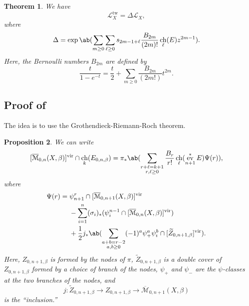 \documentclass[leqno, openany]{memoir}
\newtheorem{thm}{Theorem}[section]
\newtheorem{prop}[thm]{Proposition}
\theoremstyle{definition}
\theoremstyle{remark}
\theoremstyle{plain}
\theoremstyle{definition}
\theoremstyle{remark}
\newcommand{\mc}[1]{\mathcal{#1}}
\newcommand{\mr}[1]{\mathrm{#1}}
\newcommand{\wt}[1]{\widetilde{#1}}
\newcommand{\vir}{\mr{vir}}
\newcommand{\Mbar}{\overline{\mathcal{M}}}
\DeclareMathOperator{\ch}{ch}
\DeclareMathOperator{\ev}{ev}
\begin{document}
\begin{thm}\label{thm:qrr}
    We have
    \[ \mc{L}_X^{\mr{tw}} = \Delta \mc{L}_X, \]
    where
    \[ \Delta = \exp\ab(\sum_{m \geq 0} \sum_{\ell \geq 0} s_{2m-1+\ell} \frac{B_{2m}}{(2m)!} \ch_{\ell}(E) z^{2m-1}). \]
    Here, the Bernoulli numbers $B_{2m}$ are defined by
    \[ \frac{t}{1-e^{-t}} = \frac{t}{2} + \sum_{m \geq 0} \frac{B_{2m}}{(2m!)} t^{2m}. \]
\end{thm}

\subsection{Proof of~}

The idea is to use the Grothendieck-Riemann-Roch theorem.

\begin{prop}
    We can write
    \[ [\Mbar_{0,n}(X,\beta)]^{\vir} \cap \ch_k(E_{0,n,\beta}) = \pi_* \ab(\sum_{\substack{r+\ell=k+1 \\ r,\ell \geq 0}} \frac{B_r}{r!} \ch_{\ell}(\ev^*_{n+1} E) \Psi(r)), \]
    where
    \begin{align*}
        \Psi(r) ={}& \psi_{n+1}^r \cap [\Mbar_{0,n+1}(X,\beta)]^{\vir} \\ 
        &- \sum_{i=1}^n (\sigma_i)_* (\psi_i^{n-1} \cap [\Mbar_{0,n}(X,\beta)]^{\vir}) \\ 
        &+ \frac{1}{2} j_* \ab(\sum_{\substack{a+b=r-2 \\ a,b \geq 0}} (-1)^a \psi_+^a \psi_i^b \cap [\wt{Z}_{0,n+1,\beta}]^{\vir}). 
    \end{align*}
    Here, $Z_{0,n+1,\beta}$ is formed by the nodes of $\pi$, $\wt{Z}_{0,n+1,\beta}$ is a double cover of $Z_{0,n+1,\beta}$ formed by a choice of branch of the nodes,  $\psi_+$ and $\psi_-$ are the $\psi$-classes at the two branches of the nodes, and
    \[ j \colon \wt{Z}_{0,n+1,\beta} \to Z_{0,n+1,\beta} \to \Mbar_{0,n+1}(X,\beta) \]
    is the ``inclusion.''
\end{prop}
\end{document}

